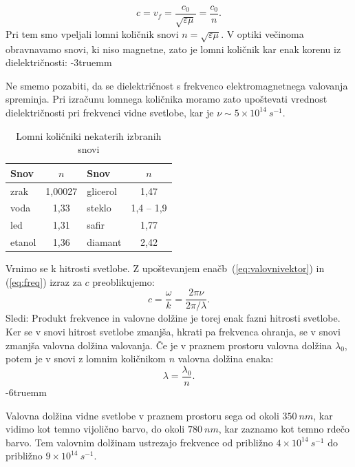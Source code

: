 \begin{equation}
c = v_f = \frac{c_0}{\sqrt{\varepsilon\mu}} = \frac{c_0}{n}.
\label{eq:03_16}
\end{equation}
Pri tem smo vpeljali lomni količnik snovi $n = \sqrt{\varepsilon\mu}$. 
V optiki večinoma obravnavamo snovi, ki niso magnetne, zato je lomni količnik kar
enak korenu iz dielektričnosti:
\vglue-3truemm
\begin{remark}
Ne smemo pozabiti, da se dielektričnost s frekvenco elektromagnetnega 
valovanja spreminja. Pri izračunu lomnega količnika moramo zato upoštevati vrednost
dielektričnosti pri  frekvenci vidne svetlobe, kar je $\nu \sim 5 \times 10^{14}~\si{s}^{-1}$. 
\end{remark}

\begin{table}[ht]
 \centering
 \small
\begin{tabular}{|l|c||l|c|} \hline  
      Snov & $n$ & Snov & $n$ \\ \hline
      zrak & 1,00027 & glicerol & 1,47\\ \hline
      voda & 1,33 & steklo & 1,4 -- 1,9\\ \hline 
      led & 1,31 & safir & 1,77\\ \hline
      etanol & 1,36 & diamant & 2,42\\ 
\hline 
\end{tabular}
  \caption{Lomni količniki nekaterih izbranih snovi}
\label{table:n}
\end{table}

Vrnimo se k hitrosti svetlobe. Z upoštevanjem enačb~(\ref{eq:valovnivektor}) in (\ref{eq:freq})
izraz za $c$ preoblikujemo:
\begin{equation}
 c = \frac{\omega}{k} = \frac{2 \pi \nu}{2 \pi/\lambda}.
 \label{eq:03_17}
\end{equation}
Sledi:
Produkt frekvence in valovne dolžine je torej enak fazni hitrosti svetlobe. Ker 
se v snovi hitrost svetlobe zmanjša, hkrati pa frekvenca ohranja, se 
v snovi zmanjša valovna dolžina valovanja. Če je v praznem prostoru valovna dolžina
$\lambda_0$, potem je v snovi z lomnim količnikom $n$ valovna dolžina enaka:
\begin{equation}
\lambda = \frac{\lambda_0}{n}.
\label{eq:03_18}
\end{equation}
\vglue-6truemm
\begin{remark}
Valovna dolžina vidne svetlobe v praznem prostoru sega od okoli $350~\si{nm}$, kar
vidimo kot temno vijolično barvo, do okoli $780~\si{nm}$, kar zaznamo kot temno rdečo 
barvo. Tem valovnim dolžinam ustrezajo frekvence od približno 
$4\times10^{14}~\si{s}^{-1}$ do približno $9\times10^{14}~\si{s}^{-1}$.
\end{remark}

